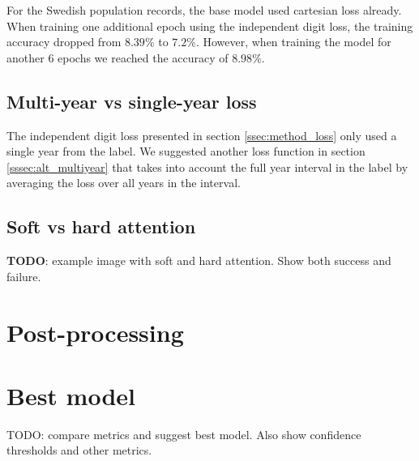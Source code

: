For the Swedish population records, the base model used cartesian loss already. When training one additional epoch using the independent digit loss, the training accuracy dropped from $8.39\%$ to $7.2\%$. However, when training the model for another 6 epochs we reached the accuracy of $8.98\%$.

\subsection{Multi-year vs single-year loss} \label{ssec:result_multiyear}

The independent digit loss presented in section \ref{ssec:method_loss} only used a single year from the label. We suggested another loss function in section \ref{sssec:alt_multiyear} that takes into account the full year interval in the label by averaging the loss over all years in the interval.


\subsection{Soft vs hard attention} \label{sssec:result_attention}

\textbf{TODO}: example image with soft and hard attention. Show both success and failure.

\section{Post-processing} \label{sec:result_post_process}

\section{Best model}

TODO: compare metrics and suggest best model. Also show confidence thresholds and other metrics.
